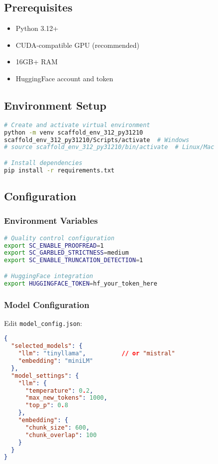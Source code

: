 \documentclass[12pt,a4paper]{article}
\begin{document}
\subsection{Prerequisites}
\begin{itemize}
    \item Python 3.12+
    \item CUDA-compatible GPU (recommended)
    \item 16GB+ RAM
    \item HuggingFace account and token
\end{itemize}

\subsection{Environment Setup}
\begin{lstlisting}[language=bash, caption=Virtual environment creation]
# Create and activate virtual environment
python -m venv scaffold_env_312_py31210
scaffold_env_312_py31210/Scripts/activate  # Windows
# source scaffold_env_312_py31210/bin/activate  # Linux/Mac

# Install dependencies
pip install -r requirements.txt
\end{lstlisting}

\subsection{Configuration}
\subsubsection{Environment Variables}
\begin{lstlisting}[language=bash, caption=Required environment variables]
# Quality control configuration
export SC_ENABLE_PROOFREAD=1
export SC_GARBLED_STRICTNESS=medium
export SC_ENABLE_TRUNCATION_DETECTION=1

# HuggingFace integration
export HUGGINGFACE_TOKEN=hf_your_token_here
\end{lstlisting}

\subsubsection{Model Configuration}
Edit \texttt{model\_config.json}:
\begin{lstlisting}[language=json, caption=Model configuration file]
{
  "selected_models": {
    "llm": "tinyllama",          // or "mistral"
    "embedding": "miniLM"
  },
  "model_settings": {
    "llm": {
      "temperature": 0.2,
      "max_new_tokens": 1000,
      "top_p": 0.8
    },
    "embedding": {
      "chunk_size": 600,
      "chunk_overlap": 100
    }
  }
}
\end{lstlisting}
\end{document}
